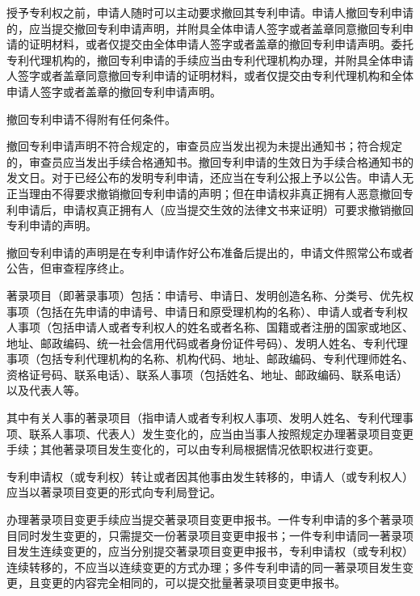 授予专利权之前，申请人随时可以主动要求撤回其专利申请。申请人撤回专利申请的，应当提交撤回专利申请声明，并附具全体申请人签字或者盖章同意撤回专利申请的证明材料，或者仅提交由全体申请人签字或者盖章的撤回专利申请声明。委托专利代理机构的，撤回专利申请的手续应当由专利代理机构办理，并附具全体申请人签字或者盖章同意撤回专利申请的证明材料，或者仅提交由专利代理机构和全体申请人签字或者盖章的撤回专利申请声明。

撤回专利申请不得附有任何条件。

撤回专利申请声明不符合规定的，审查员应当发出视为未提出通知书；符合规定的，审查员应当发出手续合格通知书。撤回专利申请的生效日为手续合格通知书的发文日。对于已经公布的发明专利申请，还应当在专利公报上予以公告。申请人无正当理由不得要求撤销撤回专利申请的声明；但在申请权非真正拥有人恶意撤回专利申请后，申请权真正拥有人（应当提交生效的法律文书来证明）可要求撤销撤回专利申请的声明。

撤回专利申请的声明是在专利申请作好公布准备后提出的，申请文件照常公布或者公告，但审查程序终止。

著录项目（即著录事项）包括：申请号、申请日、发明创造名称、分类号、优先权事项（包括在先申请的申请号、申请日和原受理机构的名称）、申请人或者专利权人事项（包括申请人或者专利权人的姓名或者名称、国籍或者注册的国家或地区、地址、邮政编码、统一社会信用代码或者身份证件号码）、发明人姓名、专利代理事项（包括专利代理机构的名称、机构代码、地址、邮政编码、专利代理师姓名、资格证号码、联系电话）、联系人事项（包括姓名、地址、邮政编码、联系电话）以及代表人等。

其中有关人事的著录项目（指申请人或者专利权人事项、发明人姓名、专利代理事项、联系人事项、代表人）发生变化的，应当由当事人按照规定办理著录项目变更手续；其他著录项目发生变化的，可以由专利局根据情况依职权进行变更。

专利申请权（或专利权）转让或者因其他事由发生转移的，申请人（或专利权人）应当以著录项目变更的形式向专利局登记。

办理著录项目变更手续应当提交著录项目变更申报书。一件专利申请的多个著录项目同时发生变更的，只需提交一份著录项目变更申报书；一件专利申请同一著录项目发生连续变更的，应当分别提交著录项目变更申报书，专利申请权（或专利权）连续转移的，不应当以连续变更的方式办理；多件专利申请的同一著录项目发生变更，且变更的内容完全相同的，可以提交批量著录项目变更申报书。

